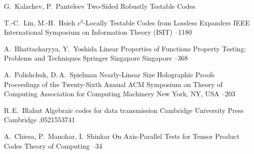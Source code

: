\by G.~Kalachev, P.~Panteleev
\eprint Two-Sided Robustly Testable Codes

\by T.-C.~Lin, M.-H.~Hsieh
\paper $c^3$-Locally Testable Codes from Lossless Expanders
 IEEE International Symposium on Information Theory (ISIT)
--1180

\by A.~Bhattacharyya, Y.~Yoshida
\paper Linear Properties of Functions
\inbook Property Testing: Problems and Techniques
\publ Springer Singapore
\publaddr Singapore
--368

\by A.~Polishchuk, D.\,A.~Spielman
\paper Nearly-Linear Size Holographic Proofs
\inbook Proceedings of the Twenty-Sixth Annual ACM Symposium on Theory of Computing
\publ Association for Computing Machinery
\publaddr New York, NY, USA
--203

\by R.\,E.~Blahut
\book Algebraic codes for data transmission
\publ Cambridge University Press
\publaddr Cambridge
,0521553741

\by A.~Chiesa, P.~Manohar, I.~Shinkar
\paper On Axis-Parallel Tests for Tensor Product Codes
\jour Theory of Computing
--34
